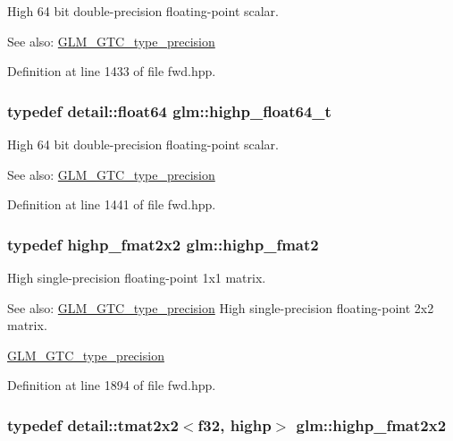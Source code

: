 High 64 bit double-precision floating-point scalar. \begin{Desc}
\item[See also:]\hyperlink{group__gtc__type__precision}{GLM\_\-GTC\_\-type\_\-precision} \end{Desc}


Definition at line 1433 of file fwd.hpp.\hypertarget{group__gtc__type__precision_ge8b3b2ace5be2a61c6bf63f12643fa15}{
\subsubsection[highp\_\-float64\_\-t]{\setlength{\rightskip}{0pt plus 5cm}typedef detail::float64 {\bf glm::highp\_\-float64\_\-t}}}
\label{group__gtc__type__precision_ge8b3b2ace5be2a61c6bf63f12643fa15}


High 64 bit double-precision floating-point scalar. \begin{Desc}
\item[See also:]\hyperlink{group__gtc__type__precision}{GLM\_\-GTC\_\-type\_\-precision} \end{Desc}


Definition at line 1441 of file fwd.hpp.\hypertarget{group__gtc__type__precision_g10d47be18a81c111a8706d0a6df5b4ea}{
\subsubsection[highp\_\-fmat2]{\setlength{\rightskip}{0pt plus 5cm}typedef highp\_\-fmat2x2 {\bf glm::highp\_\-fmat2}}}
\label{group__gtc__type__precision_g10d47be18a81c111a8706d0a6df5b4ea}


High single-precision floating-point 1x1 matrix. \begin{Desc}
\item[See also:]\hyperlink{group__gtc__type__precision}{GLM\_\-GTC\_\-type\_\-precision} High single-precision floating-point 2x2 matrix. 

\hyperlink{group__gtc__type__precision}{GLM\_\-GTC\_\-type\_\-precision} \end{Desc}


Definition at line 1894 of file fwd.hpp.\hypertarget{group__gtc__type__precision_geb76f1230ecfd4c80635d3c618405e31}{
\subsubsection[highp\_\-fmat2x2]{\setlength{\rightskip}{0pt plus 5cm}typedef detail::tmat2x2$<$f32, highp$>$ {\bf glm::highp\_\-fmat2x2}}}
\label{group__gtc__type__precision_geb76f1230ecfd4c80635d3c618405e31}


